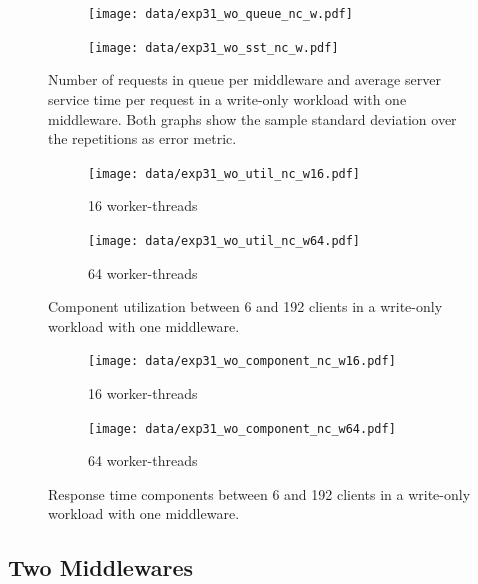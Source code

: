 \documentclass[report.tex]{subfiles}
\begin{document}
\begin{figure}
	\begin{subfigure}[b]{.499\linewidth}
		\centering
		\texttt{[image: data/exp31\_wo\_queue\_nc\_w.pdf]}
	\end{subfigure}\hfill
	\begin{subfigure}[b]{.499\linewidth}
		\centering
		\texttt{[image: data/exp31\_wo\_sst\_nc\_w.pdf]}
	\end{subfigure}\hfill
	\caption{Number of requests in queue per middleware and average server service time per request in a write-only workload with one middleware. Both graphs show the sample standard deviation over the repetitions as error metric.}\label{exp31_wo_queue_sst_nc}
\end{figure}

\begin{figure}
	\begin{subfigure}[b]{.499\linewidth}
		\centering
		\texttt{[image: data/exp31\_wo\_util\_nc\_w16.pdf]}
		\caption{16 worker-threads}
	\end{subfigure}\hfill
	\begin{subfigure}[b]{.499\linewidth}
		\centering
		\texttt{[image: data/exp31\_wo\_util\_nc\_w64.pdf]}
		\caption{64 worker-threads}
	\end{subfigure}\hfill
	\caption{Component utilization between 6 and 192 clients in a write-only workload with one middleware.}
\end{figure}

\begin{figure}
	\begin{subfigure}[b]{.499\linewidth}
		\centering
		\texttt{[image: data/exp31\_wo\_component\_nc\_w16.pdf]}
		\caption{16 worker-threads}
	\end{subfigure}\hfill
	\begin{subfigure}[b]{.499\linewidth}
		\centering
		\texttt{[image: data/exp31\_wo\_component\_nc\_w64.pdf]}
		\caption{64 worker-threads}
	\end{subfigure}\hfill
	\caption{Response time components between 6 and 192 clients in a write-only workload with one middleware.}
\end{figure}




\subsection{Two Middlewares}\label{exp32}

\end{document}

